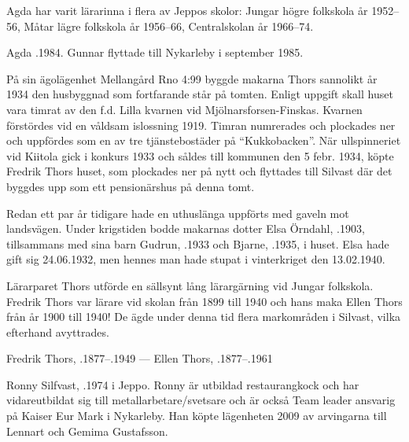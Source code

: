 Agda har varit lärarinna i flera av Jeppos skolor: Jungar högre folkskola år 1952--56, Måtar lägre folkskola år 1956--66, Centralskolan år 1966--74.

Agda .1984. Gunnar flyttade till Nykarleby i september 1985.


På sin ägolägenhet Mellangård Rno 4:99 byggde makarna Thors sannolikt år 1934 den husbyggnad som fortfarande står på tomten. Enligt uppgift skall huset vara timrat av den f.d. Lilla kvarnen vid	Mjölnarsforsen-Finskas. Kvarnen förstördes vid en våldsam islossning 1919. Timran numrerades och plockades ner och uppfördes som	en av tre tjänstebostäder på ``Kukkobacken''. När ullspinneriet vid	Kiitola gick i konkurs 1933 och såldes till kommunen den 5 febr. 1934, köpte Fredrik Thors huset, som plockades ner på nytt och flyttades till Silvast där det byggdes upp som ett pensionärshus på denna tomt.

Redan ett par år tidigare hade en uthuslänga uppförts med gaveln	mot landsvägen. Under krigstiden bodde makarnas dotter Elsa Örndahl, .1903, tillsammans med sina barn Gudrun, .1933 och Bjarne, .1935, i huset. Elsa hade gift sig 24.06.1932, men hennes man hade stupat i vinterkriget den 13.02.1940.

Lärarparet Thors utförde en sällsynt lång lärargärning vid Jungar	folkskola. Fredrik Thors var lärare vid skolan från 1899 till 1940 och hans maka Ellen Thors från år 1900 till 1940! De ägde under denna tid flera markområden i Silvast, vilka efterhand avyttrades.

Fredrik Thors, .1877--.1949  ---  Ellen Thors, .1877--.1961






Ronny Silfvast, .1974 i Jeppo. Ronny är utbildad restaurangkock och har vidareutbildat sig till metallarbetare/svetsare och är också Team leader ansvarig på Kaiser Eur Mark i Nykarleby. Han köpte lägenheten 2009 av arvingarna till Lennart och Gemima Gustafsson.


